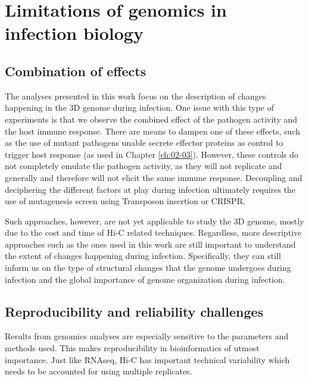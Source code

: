 
\chapter{Limitations of genomics in infection biology} %

\label{ch:03-01} %



\section{Combination of effects}

The analyses presented in this work focus on the description of changes happening in the 3D genome during infection. One issue with this type of experiments is that we observe the combined effect of the pathogen activity and the host immune response. There are means to dampen one of these effects, such as the use of mutant pathogens unable secrete effector proteins as control to trigger host response (as used in Chapter \ref{ch:02-03}). However, these controls do not completely emulate the pathogen activity, as they will not replicate and generally \cite{vogelConjugativeTransferVirulence1998} and therefore will not elicit the same immune response. Decoupling and deciphering the different factors at play during infection ultimately requires the use of mutagenesis screen using Transposon insertion or CRISPR.

Such approaches, however, are not yet applicable to study the 3D genome, mostly due to the cost and time of Hi-C related techniques. Regardless, more descriptive approaches such as the ones used in this work are still important to understand the extent of changes happening during infection. Specifically, they can still inform us on the type of structural changes that the genome undergoes during infection and the global importance of genome organization during infection.


\section{Reproducibility and reliability challenges}
Results from genomics analyses are especially sensitive to the parameters and methods used. This makes reproducibility in bioinformatics of utmost importance. Just like RNAseq, Hi-C has important technical variability which needs to be accounted for using multiple replicates.

